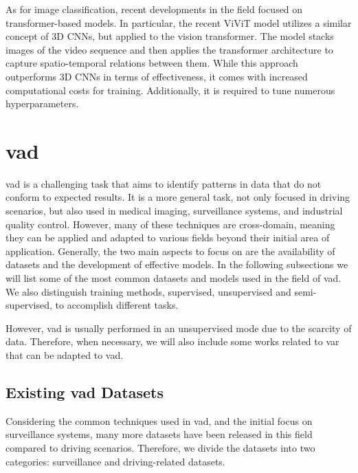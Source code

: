As for image classification, recent developments in the field focused on 
transformer-based models. In particular, the recent ViViT model \cite{vivit} 
utilizes a similar concept of 3D CNNs, but applied to the vision transformer. 
The model stacks images of the video sequence and then applies the transformer 
architecture to capture spatio-temporal relations between them. 
While this approach outperforms 3D CNNs in terms of effectiveness, it comes with 
increased computational costs for training. Additionally, it is required to 
tune numerous hyperparameters.

\section{\acl{vad}}
\ac{vad} is a challenging task that aims to 
identify patterns in data that do not conform to expected results. It is a 
more general task, not only focused in driving scenarios, but also used in 
medical imaging, surveillance systems, and industrial quality control.
However, many of these techniques are cross-domain, meaning they can be applied and 
adapted to various fields beyond their initial area of application.
Generally, the two main aspects to focus on are the availability 
of datasets and the development of effective models. In the following subsections
we will list some of the most common datasets and models used in the field of 
\ac{vad}. We also distinguish training methods, supervised, unsupervised and 
semi-supervised, to accomplish different tasks.

However, \ac{vad} is usually performed in an unsupervised mode due to the 
scarcity of data. Therefore, when necessary, we will also include some works 
related to \ac{var} that can be adapted to \ac{vad}.

\subsection{Existing \ac{vad} Datasets}
Considering the common techniques used in \ac{vad}, and the initial focus 
on surveillance systems, many more datasets have been released in this field 
compared to driving scenarios. Therefore, we divide the datasets into 
two categories: surveillance and driving-related datasets.

